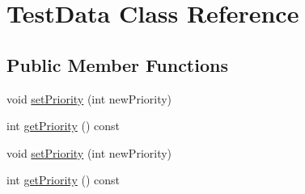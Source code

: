 \hypertarget{class_test_data}{\section{Test\+Data Class Reference}
\label{class_test_data}
}
\subsection*{Public Member Functions}
\begin{DoxyCompactItemize}
\item 
void \hyperlink{class_test_data_af6c76355a3ab75cd07ca6bba7dfe2115}{set\+Priority} (int new\+Priority)
\item 
int \hyperlink{class_test_data_a11f3f060f167d1989c94bf94860aed20}{get\+Priority} () const 
\item 
void \hyperlink{class_test_data_af6c76355a3ab75cd07ca6bba7dfe2115}{set\+Priority} (int new\+Priority)
\item 
int \hyperlink{class_test_data_a11f3f060f167d1989c94bf94860aed20}{get\+Priority} () const 
\end{DoxyCompactItemize}


